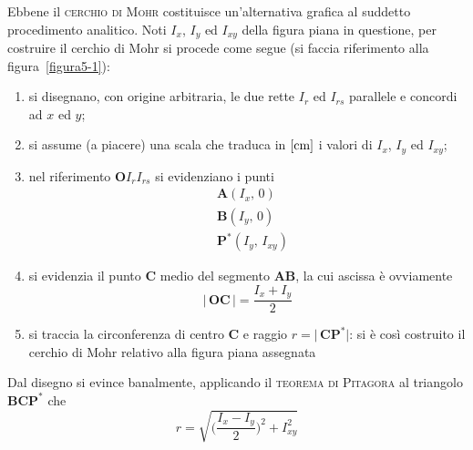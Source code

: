 \noindent Ebbene il \textsc{cerchio di Mohr} costituisce un'alternativa grafica al suddetto procedimento analitico. Noti $I_x$, $I_y$ ed $I_{xy}$ della figura piana in questione, per costruire il cerchio di Mohr si procede come segue (si faccia riferimento alla figura~\ref{figura5-1}):
\begin{enumerate}
\item si disegnano, con origine arbitraria, le due rette $I_r$ ed $I_{rs}$ parallele e concordi ad $x$ ed $y$;
\item si assume (a piacere) una scala che traduca in $[\textup{cm}]$ i valori di $I_x$, $I_y$ ed $I_{xy}$;
\item nel riferimento $\mathbf{O}I_{r}I_{rs}$ si evidenziano i punti 
\begin{align*}
&\mathbf{A}(I_{x},\,0) \\
&\mathbf{B}(I_{y},\,0) \\
&\mathbf{P}^{*}(I_{y},\,I_{xy}) 
\end{align*}
\item si evidenzia il punto $\mathbf{C}$ medio del segmento $\mathbf{AB}$, la cui ascissa è ovviamente 
\begin{equation*}
\lvert \, \mathbf{OC} \, \lvert = \frac{I_{x}+I_{y}}{2}
\end{equation*}
\item si traccia la circonferenza di centro $\mathbf{C}$ e raggio $r=\lvert\,\mathbf{C}\mathbf{P}^{*}\lvert$: si è così costruito il cerchio di Mohr relativo alla figura piana assegnata
\end{enumerate}
Dal disegno si evince banalmente, applicando il \textsc{teorema di Pitagora} al triangolo $\mathbf{B}\mathbf{C}\mathbf{P}^{*}$ che
\begin{equation} \label{equazione5-1}
\boxed{r = \sqrt{\biggl(\frac{I_{x}-I_{y}}{2}\biggr)^{2}+I_{xy}^{2}}} \tag{5.1}
\end{equation}
